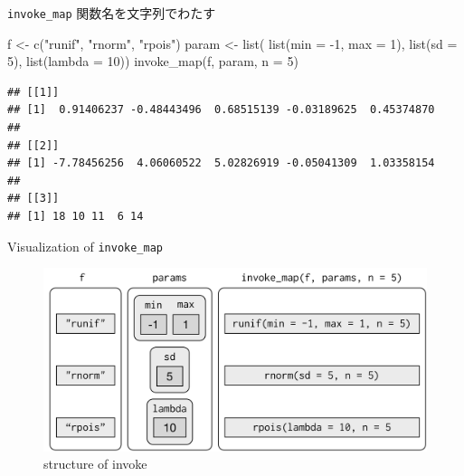 \documentclass[
  ignorenonframetext,
  aspectratio=169]{beamer}
\newenvironment{Shaded}{\begin{snugshade}}{\end{snugshade}}
\newcommand{\AttributeTok}[1]{\textcolor[rgb]{0.77,0.63,0.00}{#1}}
\newcommand{\DecValTok}[1]{\textcolor[rgb]{0.00,0.00,0.81}{#1}}
\newcommand{\FunctionTok}[1]{\textcolor[rgb]{0.00,0.00,0.00}{#1}}
\newcommand{\NormalTok}[1]{#1}
\newcommand{\OtherTok}[1]{\textcolor[rgb]{0.56,0.35,0.01}{#1}}
\newcommand{\SpecialCharTok}[1]{\textcolor[rgb]{0.00,0.00,0.00}{#1}}
\newcommand{\StringTok}[1]{\textcolor[rgb]{0.31,0.60,0.02}{#1}}
\begin{document}
\begin{frame}[fragile]{\texttt{invoke\_map}}
\protect\hypertarget{invoke_map}{}
関数名を文字列でわたす

\begin{Shaded}
\begin{Highlighting}[]
\NormalTok{f }\OtherTok{\textless{}{-}} \FunctionTok{c}\NormalTok{(}\StringTok{"runif"}\NormalTok{, }\StringTok{"rnorm"}\NormalTok{, }\StringTok{"rpois"}\NormalTok{)}
\NormalTok{param }\OtherTok{\textless{}{-}} \FunctionTok{list}\NormalTok{(}
          \FunctionTok{list}\NormalTok{(}\AttributeTok{min =} \SpecialCharTok{{-}}\DecValTok{1}\NormalTok{, }\AttributeTok{max =} \DecValTok{1}\NormalTok{), }
          \FunctionTok{list}\NormalTok{(}\AttributeTok{sd =} \DecValTok{5}\NormalTok{), }
          \FunctionTok{list}\NormalTok{(}\AttributeTok{lambda =} \DecValTok{10}\NormalTok{))}
\FunctionTok{invoke\_map}\NormalTok{(f, param, }\AttributeTok{n =} \DecValTok{5}\NormalTok{)}
\end{Highlighting}
\end{Shaded}

\begin{verbatim}
## [[1]]
## [1]  0.91406237 -0.48443496  0.68515139 -0.03189625  0.45374870
## 
## [[2]]
## [1] -7.78456256  4.06060522  5.02826919 -0.05041309  1.03358154
## 
## [[3]]
## [1] 18 10 11  6 14
\end{verbatim}
\end{frame}

\begin{frame}{Visualization of \texttt{invoke\_map}}
\protect\hypertarget{visualization-of-invoke_map}{}
\begin{figure}
\centering
\includegraphics{../img/lists-invoke.png}
\caption{structure of invoke}
\end{figure}
\end{frame}
\end{document}
